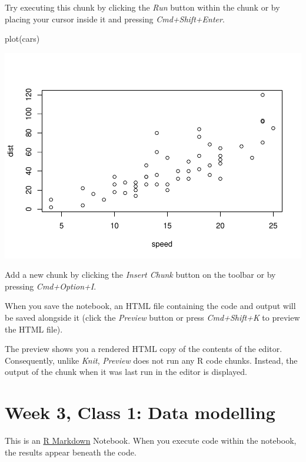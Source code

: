 \documentclass[
]{book}
\newenvironment{Shaded}{\begin{snugshade}}{\end{snugshade}}
\newcommand{\FunctionTok}[1]{\textcolor[rgb]{0.00,0.00,0.00}{#1}}
\newcommand{\NormalTok}[1]{#1}
\begin{document}
Try executing this chunk by clicking the \emph{Run} button within the chunk or by placing your cursor inside it and pressing \emph{Cmd+Shift+Enter}.

\begin{Shaded}
\begin{Highlighting}[]
\FunctionTok{plot}\NormalTok{(cars)}
\end{Highlighting}
\end{Shaded}

\includegraphics{_main_files/figure-latex/unnamed-chunk-29-1.pdf}

Add a new chunk by clicking the \emph{Insert Chunk} button on the toolbar or by pressing \emph{Cmd+Option+I}.

When you save the notebook, an HTML file containing the code and output will be saved alongside it (click the \emph{Preview} button or press \emph{Cmd+Shift+K} to preview the HTML file).

The preview shows you a rendered HTML copy of the contents of the editor. Consequently, unlike \emph{Knit}, \emph{Preview} does not run any R code chunks. Instead, the output of the chunk when it was last run in the editor is displayed.

\hypertarget{week-3-class-1-data-modelling}{%
\chapter{Week 3, Class 1: Data modelling}\label{week-3-class-1-data-modelling}}

This is an \href{http://rmarkdown.rstudio.com}{R Markdown} Notebook. When you execute code within the notebook, the results appear beneath the code.
\end{document}
